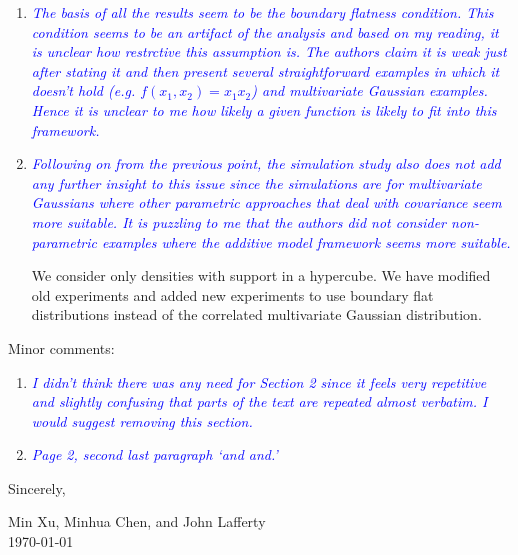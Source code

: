 \documentclass[pdftex,12pt]{article}
\def\rc#1{{\it\textcolor{blue}{#1}}\smallskip}
\begin{document}
\begin{enumerate}
\item \rc{The basis of all the results seem to be the boundary flatness
condition. This condition seems to be an artifact of the analysis and
based on my reading, it is unclear how restrctive this assumption
is. The authors claim it is weak just after stating it and then
present several straightforward examples in which it doesn't hold
(e.g. $f(x_1,x_2)=x_1 x_2$) and multivariate Gaussian examples. Hence it is unclear to me how
likely a given function is likely to fit into this framework.}

\item \rc{Following on from the previous point, the simulation study also does
not add any further insight to this issue since the simulations are
for multivariate Gaussians where other parametric approaches that deal
with covariance seem more suitable. It is puzzling to me that the
authors did not consider non-parametric examples where the additive
model framework seems more suitable.}

We consider only densities with support in a hypercube. We have modified old experiments and added new experiments to use boundary flat distributions instead of the correlated multivariate Gaussian distribution. 


\end{enumerate}

Minor comments:

\begin{enumerate}
\item \rc{I didn't think there was any need for Section 2
  since it feels very repetitive and slightly confusing that parts of
  the text are repeated almost verbatim. I would suggest removing this section.}

\item \rc{Page 2, second last paragraph `and and.'}
\end{enumerate}


\vspace*{10pt}

Sincerely, 


Min Xu, Minhua Chen, and John Lafferty\\[1pt]
\today{}


\end{document}
